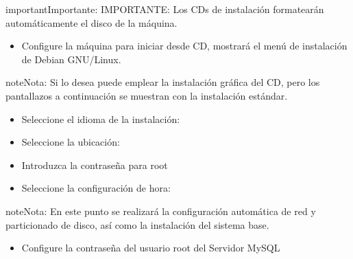 \documentclass[letterpaper,10pt,spanish]{sphinxmanual}
\begin{document}
\begin{notice}{important}{Importante:}
IMPORTANTE: Los CDs de instalación formatearán automáticamente el disco de la máquina.
\end{notice}
\begin{itemize}
\item {} 
Configure la máquina para iniciar desde CD, mostrará el menú de instalación de Debian GNU/Linux.

\end{itemize}

\begin{notice}{note}{Nota:}
Si lo desea puede emplear la instalación gráfica del CD, pero los pantallazos a continuación se muestran con la instalación estándar.
\end{notice}

\noindent{}
\begin{itemize}
\item {} 
Seleccione el idioma de la instalación:

\end{itemize}

\noindent{}
\begin{itemize}
\item {} 
Seleccione la ubicación:

\end{itemize}

\noindent{}
\begin{itemize}
\item {} 
Introduzca la contraseña para root

\end{itemize}

\noindent{}
\begin{itemize}
\item {} 
Seleccione la configuración de hora:

\end{itemize}

\noindent{}

\begin{notice}{note}{Nota:}
En este punto se realizará la configuración automática de red y particionado de disco, así como la instalación del sistema base.
\end{notice}
\begin{itemize}
\item {} 
Configure la contraseña del usuario root del Servidor MySQL

\end{itemize}
\end{document}
